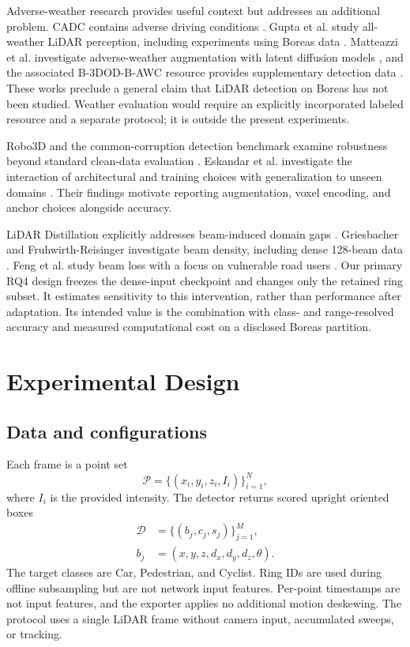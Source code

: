\documentclass[10pt,twocolumn]{article}
\begin{document}
Adverse-weather research provides useful context but addresses an additional problem. CADC contains adverse driving conditions \cite{pitropov2021cadc}. Gupta et al. study all-weather LiDAR perception, including experiments using Boreas data \cite{gupta2025allweather}. Matteazzi et al. investigate adverse-weather augmentation with latent diffusion models \cite{matteazzi2026augmentation}, and the associated B-3DOD-B-AWC resource provides supplementary detection data \cite{boreas_awc}. These works preclude a general claim that LiDAR detection on Boreas has not been studied. Weather evaluation would require an explicitly incorporated labeled resource and a separate protocol; it is outside the present experiments.


Robo3D and the common-corruption detection benchmark examine robustness beyond standard clean-data evaluation \cite{kong2023robo3d,dong2023corruptions}. Eskandar et al. investigate the interaction of architectural and training choices with generalization to unseen domains \cite{eskandar2024generalization}. Their findings motivate reporting augmentation, voxel encoding, and anchor choices alongside accuracy.

LiDAR Distillation explicitly addresses beam-induced domain gaps \cite{wei2022lidardistillation}. Griesbacher and Fruhwirth-Reisinger investigate beam density, including dense 128-beam data \cite{griesbacher2025beamdensity}. Feng et al. study beam loss with a focus on vulnerable road users \cite{feng2026beamloss}. Our primary RQ4 design freezes the dense-input checkpoint and changes only the retained ring subset. It estimates sensitivity to this intervention, rather than performance after adaptation. Its intended value is the combination with class- and range-resolved accuracy and measured computational cost on a disclosed Boreas partition.



\section{Experimental Design}
\label{sec:benchmark}
\subsection{Data and configurations}
Each frame is a point set
\begin{equation}
\mathcal{P}=\{(x_i,y_i,z_i,I_i)\}_{i=1}^{N},
\end{equation}
where $I_i$ is the provided intensity. The detector returns scored upright oriented boxes
\begin{equation}
\begin{aligned}\mathcal{D}&=\{(b_j,c_j,s_j)\}_{j=1}^{M},\\ b_j&=(x,y,z,d_x,d_y,d_z,\theta).\end{aligned}
\end{equation}
The target classes are Car, Pedestrian, and Cyclist. Ring IDs are used during offline subsampling but are not network input features. Per-point timestamps are not input features, and the exporter applies no additional motion deskewing. The protocol uses a single LiDAR frame without camera input, accumulated sweeps, or tracking.
\end{document}
